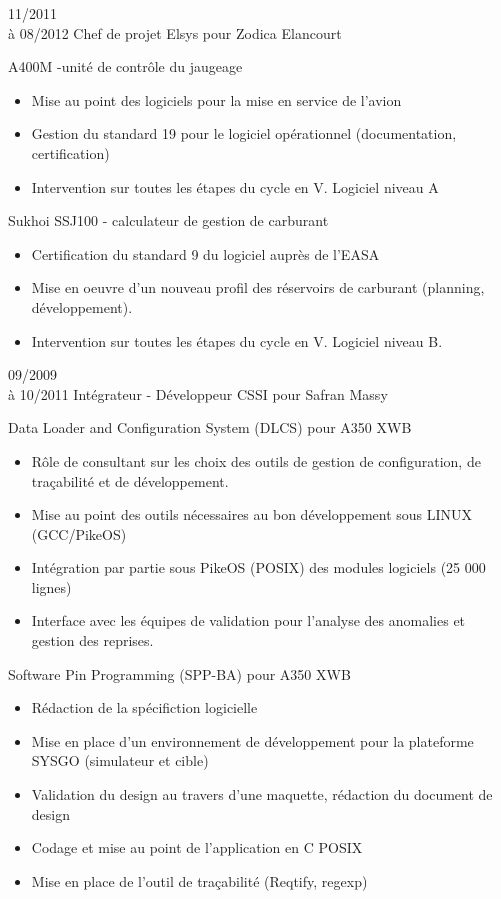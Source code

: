 \documentclass[10pt,a4paper]{moderncv}       %
\begin{document}
\cventry
{11/2011\\à 08/2012}   %
{Chef de projet}  %
{Elsys pour Zodica} %
{Elancourt}            %
{}                     %
{
A400M -unité de contrôle du jaugeage
\begin{itemize}
  \item Mise au point des logiciels pour la mise en service de l’avion
  \item Gestion du standard 19 pour le logiciel opérationnel (documentation, certification)
  \item Intervention sur toutes les étapes du cycle en V. Logiciel niveau A
\end{itemize}
Sukhoi SSJ100 - calculateur de gestion de carburant
\begin{itemize}
  \item Certification du standard 9 du logiciel auprès de l’EASA
  \item Mise en oeuvre d’un nouveau profil des réservoirs de carburant (planning, développement).
  \item Intervention sur toutes les étapes du cycle en V. Logiciel niveau B.
\end{itemize}
\newline{}}
\cventry
{09/2009\\à 10/2011}       %
{Intégrateur - Développeur} %
{CSSI pour Safran}         %
{Massy}                    %
{}                         %
{
Data Loader and Configuration System (DLCS) pour A350 XWB
\begin{itemize}
  \item Rôle  de consultant sur les choix des outils de gestion de configuration, de traçabilité et de développement.
  \item Mise au point des outils nécessaires au bon développement sous LINUX
  (GCC/PikeOS)
  \item Intégration par partie sous PikeOS (POSIX) des modules logiciels (25 000
  lignes)
  \item Interface avec les équipes de validation pour l'analyse des anomalies et
  gestion des reprises.
\end{itemize}
Software Pin Programming (SPP-BA) pour A350 XWB
\begin{itemize}
  \item Rédaction de la spécifiction logicielle
  \item Mise en place d'un environnement de développement pour la plateforme
  SYSGO (simulateur et cible)
  \item Validation du design au travers d'une maquette, rédaction du document de design
  \item Codage et mise au point de l’application en C POSIX
  \item Mise en place de l’outil de traçabilité (Reqtify, regexp)
\end{itemize}
\newline{}}
\end{document}
